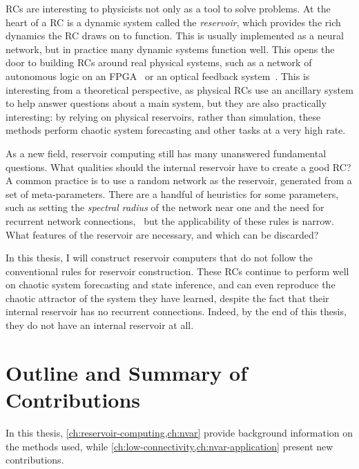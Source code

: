 RCs are interesting to physicists not only as a tool to solve
problems. At the heart of a RC is a dynamic system called the
\emph{reservoir}, which provides the rich dynamics the RC draws on to
function. This is usually implemented as a neural network, but in
practice many dynamic systems function well. This opens the door to
building RCs around real physical systems, such as a network of
autonomous logic on an FPGA~\cite{canaday2018} or an optical feedback
system~\cite{antonik2016}. This is interesting from a theoretical
perspective, as physical RCs use an ancillary system to help answer
questions about a main system, but they are also practically
interesting: by relying on physical reservoirs, rather than
simulation, these methods perform chaotic system forecasting and other
tasks at a very high rate.

As a new field, reservoir computing still has many unanswered
fundamental questions. What qualities should the internal reservoir
have to create a good RC? A common practice is to use a random network
as the reservoir, generated from a set of meta-parameters. There are a
handful of heuristics for some parameters, such as setting the
\emph{spectral radius} of the network near one and the need for
recurrent network connections,~\cite{jaeger2001,lukosevicius2012} but
the applicability of these rules is narrow. What features of the
reservoir are necessary, and which can be discarded?

In this thesis, I will construct reservoir computers that do not
follow the conventional rules for reservoir construction. These RCs
continue to perform well on chaotic system forecasting and state
inference, and can even reproduce the chaotic attractor of the system
they have learned, despite the fact that their internal reservoir has
no recurrent connections. Indeed, by the end of this thesis, they do
not have an internal reservoir at all.

\section{Outline and Summary of Contributions}

In this thesis, \cref{ch:reservoir-computing,ch:nvar} provide
background information on the methods used, while
\cref{ch:low-connectivity,ch:nvar-application} present new
contributions.

